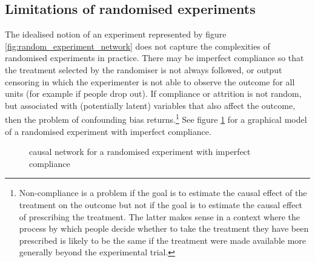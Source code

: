 \documentclass[11pt,a4paper,twoside]{report}
\theoremstyle{plain}
\theoremstyle{definition}
\begin{document}
\subsection{Limitations of randomised experiments}
\label{subsec:limitations_of_experiment}

The idealised notion of an experiment represented by figure \ref{fig:random_experiment_network} does not capture the complexities of randomised experiments in practice. There may be imperfect compliance so that the treatment selected by the randomiser is not always followed, or output censoring in which the experimenter is not able to observe the outcome for all units (for example if people drop out). If compliance or attrition is not random, but associated with (potentially latent) variables that also affect the outcome, then the problem of confounding bias returns.\footnote{Non-compliance is a problem if the goal is to estimate the causal effect of the treatment on the outcome but not if the goal is to estimate the causal effect of prescribing the treatment. The latter makes sense in a context where the process by which people decide whether to take the treatment they have been prescribed is likely to be the same if the treatment were made available more generally beyond the experimental trial.} See figure \ref{fig:random_experiment_network_imperfect_compliance} for a graphical model of a randomised experiment with imperfect compliance.

\begin{figure}
\centering
{}
\caption{causal network for a randomised experiment with imperfect compliance}
\label{fig:random_experiment_network_imperfect_compliance}
\end{figure} 
\end{document}
